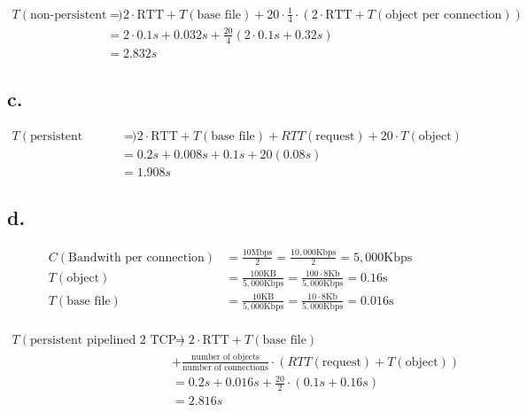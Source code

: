 \documentclass[12pt]{article}
\begin{document}
\begin{align*}
    T(\text{non-persistent 4 TCP}) &= 2 \cdot \text{RTT} + T(\text{base file}) + 20 \cdot \frac{1}{4} \cdot (2 \cdot \text{RTT} + T(\text{object per connection})) \\
    &= 2 \cdot 0.1s + 0.032s + \frac{20}{4} (2 \cdot 0.1s + 0.32s) \\
    &= 2.832s
\end{align*}


\subsection{c.}

\begin{align*}
    T(\text{persistent pipelined}) &= 2 \cdot \text{RTT} + T(\text{base file}) + RTT(\text{request}) + 20 \cdot T(\text{object}) \\
    &= 0.2s + 0.008s + 0.1s + 20(0.08s) \\
    &= 1.908s
\end{align*}

\subsection{d.}

\begin{align*}
    C(\text{Bandwith per connection}) &= \frac{10 \text{Mbps}}{2} = \frac{10,000 \text{Kbps}}{2} = 5,000 \text{Kbps} \\
    T(\text{object}) &= \frac{100 \text{KB}}{5,000 \text{Kbps}} = \frac{100 \cdot 8 \text{Kb}}{5,000 \text{Kbps}} = 0.16 \text{s} \\
    T(\text{base file}) &= \frac{10 \text{KB}}{5,000 \text{Kbps}} = \frac{10 \cdot 8 \text{Kb}}{5,000 \text{Kbps}} = 0.016 \text{s} \\
\end{align*}


\begin{align*}
    T(\text{persistent pipelined 2 TCP}) &= 2 \cdot \text{RTT} + T(\text{base file})  \\
    &+ \frac{\text{number of objects}}{\text{number of connections}} \cdot (RTT(\text{request}) + T(\text{object})) \\
    &= 0.2s + 0.016s + \frac{20}{2} \cdot (0.1s + 0.16s) \\
    &= 2.816s
\end{align*}

\end{document}
